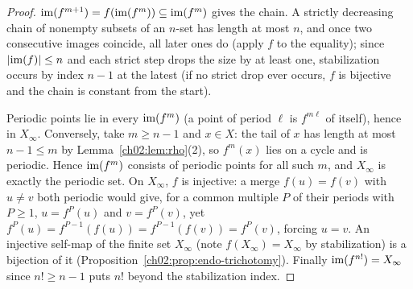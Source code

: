 \begin{proof}
$\mathrm{im}(f^{m+1}) = f(\mathrm{im}(f^m)) \subseteq \mathrm{im}(f^m)$ gives the chain. A
strictly decreasing chain of nonempty subsets of an $n$-set has length at
most $n$, and once two consecutive images coincide, all later ones do
(apply $f$ to the equality); since $|\mathrm{im}(f)| \le n$ and each strict step
drops the size by at least one, stabilization occurs by index $n - 1$ at
the latest (if no strict drop ever occurs, $f$ is bijective and the chain
is constant from the start).

Periodic points lie in every $\mathrm{im}(f^m)$ (a point of period $\ell$ is
$f^{m \ell}$ of itself), hence in $X_\infty$. Conversely, take
$m \geq n - 1$ and $x \in X$: the tail of $x$ has length at most
$n - 1 \leq m$ by Lemma~\ref{ch02:lem:rho}(2), so $f^{m}(x)$ lies on a
cycle and is periodic. Hence $\mathrm{im}(f^{m})$ consists of periodic points
for all such $m$, and $X_\infty$ is exactly the periodic set. On
$X_\infty$, $f$ is injective: a merge
$f(u) = f(v)$ with $u \neq v$ both periodic would give, for a common
multiple $P$ of their periods with $P \ge 1$,
$u = f^{P}(u)$ and $v = f^{P}(v)$, yet
$f^{P}(u) = f^{P-1}(f(u)) = f^{P-1}(f(v)) = f^{P}(v)$, forcing
$u = v$. An injective self-map of the finite set $X_\infty$
(note $f(X_\infty) = X_\infty$ by stabilization) is a bijection of it
(Proposition~\ref{ch02:prop:endo-trichotomy}). Finally
$\mathrm{im}(f^{n!}) = X_\infty$ since $n! \geq n - 1$ puts $n!$ beyond the
stabilization index.
\end{proof}

